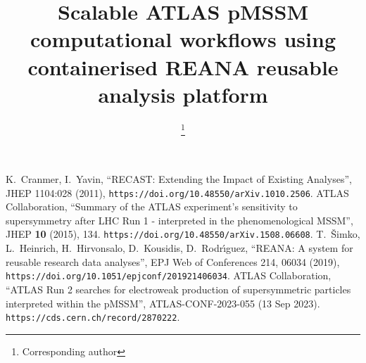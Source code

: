\documentclass{latex/webofc}
\begin{document}
%
\title{Scalable ATLAS pMSSM computational workflows using containerised REANA reusable analysis platform}

\author{   \and
           \and
           \and
           \and
           \and
           \and
           \fnsep\thanks{Corresponding author } \and
           \and
          }


\abstract{%
 
}
%
\maketitle
%


%

%

%

%


\begin{thebibliography}{00}
 K.~Cranmer, I.~Yavin, ``RECAST: Extending the Impact of Existing Analyses'', JHEP 1104:028 (2011), \texttt{https://doi.org/10.48550/arXiv.1010.2506}.
 ATLAS Collaboration, ``Summary of the ATLAS experiment's sensitivity to supersymmetry after LHC Run 1 - interpreted in the phenomenological MSSM'', JHEP \textbf{10} (2015), 134. \texttt{https://doi.org/10.48550/arXiv.1508.06608}.
 T.~\v{S}imko,  L.~Heinrich,  H.~Hirvonsalo,  D.~Kousidis,  D.~Rodr\'{\i}guez, ``REANA: A system for reusable research data analyses'', EPJ Web of Conferences 214, 06034 (2019), \texttt{https://doi.org/10.1051/epjconf/201921406034}.
 ATLAS Collaboration, ``ATLAS Run 2 searches for electroweak production of supersymmetric particles interpreted within the pMSSM'', ATLAS-CONF-2023-055 (13 Sep 2023). \texttt{https://cds.cern.ch/record/2870222}.
\end{thebibliography}

\end{document}
